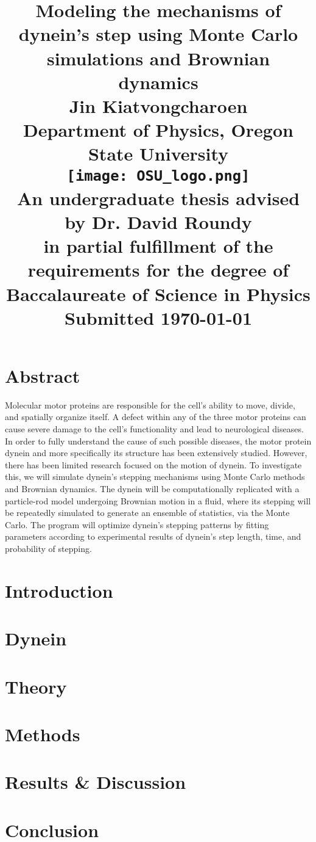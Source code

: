 \documentclass[12pt]{report}
\title{
	\Huge{Modeling the mechanisms of dynein's step using Monte Carlo simulations and Brownian dynamics}\vspace{1em}\\
	\Large{Jin Kiatvongcharoen} \vspace{0.5em}\\ 
	\normalsize{Department of Physics, Oregon State University}\vspace{2em}\\
	\texttt{[image: OSU\_logo.png]}\vspace{1em}\\
	\normalsize{An undergraduate thesis advised by Dr. David Roundy}\\
	\normalsize{in partial fulfillment of the requirements for the degree of}\\
	\normalsize{Baccalaureate of Science in Physics}\vspace{1.5 em}\\
	\normalsize{Submitted \today}\\


}
\date{}
\begin{document}
    \maketitle
    \onehalfspacing


	\chapter*{Abstract}
	Molecular motor proteins are responsible for the cell’s ability to move, divide, and spatially organize itself. A defect within any of the three motor proteins can cause severe damage to the cell’s functionality and lead to neurological diseases. In order to fully understand the cause of such possible diseases, the motor protein dynein and more specifically its structure has been extensively studied. However, there has been limited research focused on the motion of dynein. To investigate this, we will simulate dynein’s stepping mechanisms using Monte Carlo methods and Brownian dynamics. The dynein will be computationally replicated with a particle-rod model undergoing Brownian motion in a fluid, where its stepping will be repeatedly simulated to generate an ensemble of statistics, via the Monte Carlo. The program will optimize dynein’s stepping patterns by fitting parameters according to experimental results of dynein’s step length, time, and probability of stepping. 
	
    \begin{spacing}{1.2}
	\tableofcontents
	\listoffigures
	\end{spacing}
	
	
	\chapter{Introduction}
	
	\chapter{Dynein}
	
	\chapter{Theory}
	
	\chapter{Methods}
	
	\chapter{Results \& Discussion}
	
	\chapter{Conclusion}
	


\newpage
\cite{Burgess2003} \cite{Cianfrocco2015mechanism} \cite{Dewitt2012} \cite{Capek2017}


\end{document}

